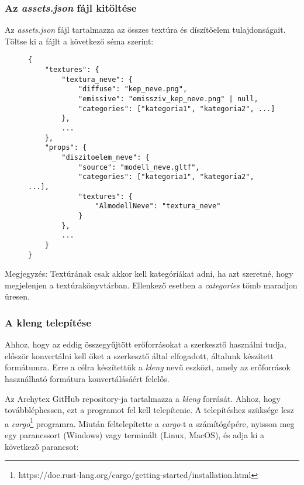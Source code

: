 \subsubsection{Az \emph{assets.json} fájl kitöltése}

Az \emph{assets.json} fájl tartalmazza az összes textúra és díszítőelem tulajdonságait. Töltse ki
a fájlt a következő séma szerint:

\begin{figure}[h]
    \centering
    \begin{minipage}{.85\textwidth}
        \centering
        \begin{lstlisting}
{
    "textures": {
        "textura_neve": {
            "diffuse": "kep_neve.png",
            "emissive": "emissziv_kep_neve.png" | null,
            "categories": ["kategoria1", "kategoria2", ...]
        },
        ...
    },
    "props": {
        "diszitoelem_neve": {
            "source": "modell_neve.gltf",
            "categories": ["kategoria1", "kategoria2", ...],
            "textures": {
                "AlmodellNeve": "textura_neve"
            }
        },
        ...
    }
}
\end{lstlisting}
    \end{minipage}
\end{figure}

Megjegyzés: Textúrának csak akkor kell kategóriákat adni, ha azt szeretné, hogy megjelenjen a
textúrakönyvtárban. Ellenkező esetben a \emph{categories} tömb maradjon üresen.

\pagebreak

\subsubsection{A kleng telepítése}

Ahhoz, hogy az eddig összegyűjtött erőforrásokat a szerkesztő használni tudja, először konvertálni
kell őket a szerkesztő által elfogadott, általunk készített formátumra. Erre a célra készítettük
a \emph{kleng} nevű eszközt, amely az erőforrások használható formátura konvertálásáért felelős.

Az Archytex GitHub repository-ja tartalmazza a \emph{kleng} forrását. Ahhoz, hogy továbbléphessen,
ezt a programot fel kell telepítenie. A telepítéshez szüksége lesz a
\emph{cargo}\footnote{https://doc.rust-lang.org/cargo/getting-started/installation.html}
programra. Miután feltelepítette a \emph{cargo}-t a számítógépére, nyisson meg egy parancssort
(Windows) vagy terminált (Linux, MacOS), és adja ki a következő parancsot:


